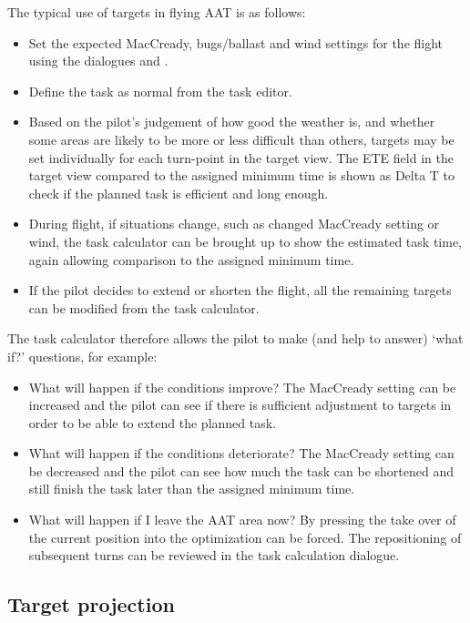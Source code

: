 The typical use of targets in flying AAT is as follows:
\begin{itemize}
\item Set the expected MacCready, bugs/ballast and wind settings
  for the flight using the dialogues  and .
\item Define the task as normal from the task editor.
\item Based on the pilot's judgement of how good the weather is,
  and whether some areas are likely to be more or less difficult than
  others, targets may be set individually for each turn-point in the
  target view.  The ETE field in the target view compared to
  the assigned minimum time is shown as Delta T to check if the planned
  task is efficient and long enough.
\item During flight, if situations change, such as changed MacCready setting
  or wind, the task calculator can be brought up to show the estimated
  task time, again allowing comparison to the assigned minimum time.
\item If the pilot decides to extend or shorten the flight, all the remaining
  targets can be modified from the task calculator.
\end{itemize}

The task calculator therefore allows the pilot to make (and help to
answer) `what if?' questions, for example:
\begin{itemize}
\item What will happen if the conditions improve?  The MacCready setting can be
increased and the pilot can see if there is sufficient adjustment to targets in
order to be able to extend the planned task.
\item What will happen if the conditions deteriorate?  The MacCready setting can
be decreased and the pilot can see how much the task can be shortened and still
finish the task later than the assigned minimum time.
\item What will happen if I leave the AAT area now?  By pressing  the take over of the current position into the optimization can
be forced. The repositioning of subsequent turns can be reviewed in the task calculation
dialogue.
\end{itemize}

\subsection*{Target projection}

